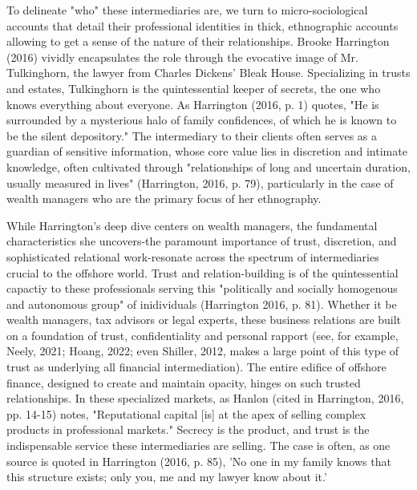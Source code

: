 To delineate "who" these intermediaries are, we turn to micro-sociological accounts that detail their professional identities in thick, ethnographic accounts allowing to get a sense of the nature of their relationships. Brooke Harrington (2016) vividly encapsulates the role through the evocative image of Mr. Tulkinghorn, the lawyer from Charles Dickens' Bleak House. Specializing in trusts and estates, Tulkinghorn is the quintessential keeper of secrets, the one who knows everything about everyone. As Harrington (2016, p. 1) quotes, "He is surrounded by a mysterious halo of family confidences, of which he is known to be the silent depository." The intermediary to their clients often serves as a guardian of sensitive information, whose core value lies in discretion and intimate knowledge, often cultivated through "relationships of long and uncertain duration, usually measured in lives" (Harrington, 2016, p. 79), particularly in the case of wealth managers who are the primary focus of her ethnography.

While Harrington’s deep dive centers on wealth managers, the fundamental characteristics she uncovers-the paramount importance of trust, discretion, and sophisticated relational work-resonate across the spectrum of intermediaries crucial to the offshore world. Trust and relation-building is of the quintessential capactiy to these professionals serving this "politically and socially homogenous and autonomous group" of inidividuals (Harrington 2016, p. 81). Whether it be wealth managers, tax advisors or legal experts, these business relations are built on a foundation of trust, confidentiality and personal rapport (see, for example, Neely, 2021; Hoang, 2022; even Shiller, 2012, makes a large point of this type of trust as underlying all financial intermediation). The entire edifice of offshore finance, designed to create and maintain opacity, hinges on such trusted relationships. In these specialized markets, as Hanlon (cited in Harrington, 2016, pp. 14-15) notes, "Reputational capital [is] at the apex of selling complex products in professional markets." Secrecy is the product, and trust is the indispensable service these intermediaries are selling. The case is often, as one source is quoted in Harrington (2016, p. 85), 'No one in my family knows that this structure exists; only you, me and my lawyer know about it.’ 

